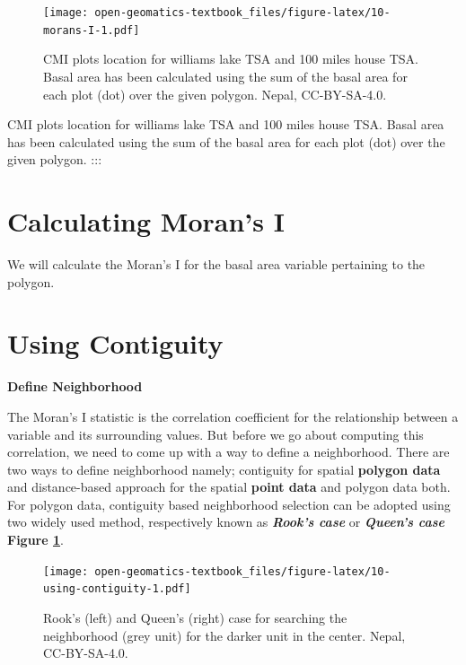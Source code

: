 \documentclass[
]{book}
\begin{document}
\begin{figure}
\centering
\texttt{[image: open-geomatics-textbook\_files/figure-latex/10-morans-I-1.pdf]}
\caption{\label{fig:10-morans-I}CMI plots location for williams lake TSA and 100 miles house TSA. Basal area has been calculated using the sum of the basal area for each plot (dot) over the given polygon. Nepal, CC-BY-SA-4.0.}
\end{figure}

CMI plots location for williams lake TSA and 100 miles house TSA. Basal area has been calculated using the sum of the basal area for each plot (dot) over the given polygon.
:::

\hypertarget{calculating-morans-i}{%
\section*{Calculating Moran's I}\label{calculating-morans-i}}

We will calculate the Moran's I for the basal area variable pertaining to the polygon.

\hypertarget{using-contiguity}{%
\section*{Using Contiguity}\label{using-contiguity}}

\textbf{Define Neighborhood}

The Moran's I statistic is the correlation coefficient for the relationship between a variable and its surrounding values. But before we go about computing this correlation, we need to come up with a way to define a neighborhood. There are two ways to define neighborhood namely; contiguity for spatial \textbf{polygon data} and distance-based approach for the spatial \textbf{point data} and polygon data both. For polygon data, contiguity based neighborhood selection can be adopted using two widely used method, respectively known as \textbf{\emph{Rook's case}} or \textbf{\emph{Queen's case}} \textbf{Figure \ref{fig:10-morans-I}}.

\begin{figure}
\centering
\texttt{[image: open-geomatics-textbook\_files/figure-latex/10-using-contiguity-1.pdf]}
\caption{\label{fig:10-using-contiguity}Rook's (left) and Queen's (right) case for searching the neighborhood (grey unit) for the darker unit in the center. Nepal, CC-BY-SA-4.0.}
\end{figure}
\end{document}
